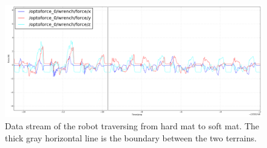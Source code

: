 \documentclass[USenglish]{ifimaster}  %
\begin{document}
	
	
	\begin{figure}[h]
		\centering
		\includegraphics[width=\textwidth,height=\textheight,keepaspectratio]{Figures/MB3MM_line2}
		\caption[Data stream of the transition from hard mat to soft mat.]{Data stream of the robot traversing from hard mat to soft mat. The thick gray horizontal line is the boundary between the two terrains.}
		\label{fig:hardmatSoftMat}
	\end{figure}
	
	\begin{table}[h]
		\centering
		\caption[Results of transistion from hard mat to floor]{Estimated probability of each terrain per step walking from hard mat to soft mat. Values are marked green to represent correct predictions. For incorrect predictions, the actual value is marked yellow while the predicted value is marked red.}
		\label{hardmatSoftMat}
	\end{table}
	\FloatBarrier
	\clearpage
	
\end{document}
